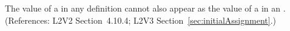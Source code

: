 The value of a   in any \InitialAssignment definition
cannot also appear as the value of a   in an
\AssignmentRule.  (References: L2V2 Section~4.10.4; L2V3
Section~\ref{sec:initialAssignment}.)
